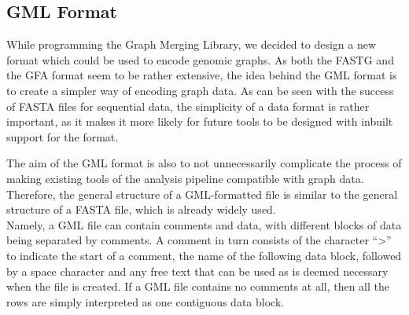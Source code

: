 \documentclass[a4paper,12pt,twoside,BCOR=10mm]{scrbook}
\begin{document}
\subsection{GML Format}

While programming the Graph Merging Library, we decided to design a new format 
which could be used to encode genomic graphs. 
As both the FASTG and the GFA format seem to be rather extensive, 
the idea behind the GML format is to create a simpler way of encoding graph data. 
As can be seen with the success of FASTA files for sequential data, 
the simplicity of a data format is rather important, as it makes it more likely 
for future tools to be designed with inbuilt support for the format.

The aim of the GML format is also to not unnecessarily complicate the process of 
making existing tools of the analysis pipeline 
compatible with graph data. 
Therefore, the general structure of a GML-formatted file is similar to the general structure 
of a FASTA file, which is already widely used. \\
Namely, a GML file can contain comments and data, with different blocks of data being separated 
by comments. A comment in turn consists of the character “>” to indicate the start of a comment, 
the name of the following data block, followed by a space character and any free text that 
can be used as is deemed necessary when the file is created. 
If a GML file contains no comments at all, 
then all the rows are simply interpreted as one contiguous data block.

%
\end{document}
